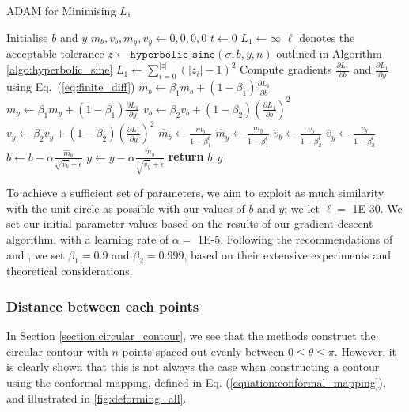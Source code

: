 \documentclass[a4paper]{report}
\begin{document}
\begin{algorithm}[H]
\caption{ADAM for Minimising $L_1$}
\label{algo:adam_l1}
\begin{algorithmic}[1]
\State Initialise $b$ and $y$
\State $m_b, v_b, m_y, v_y \gets 0, 0, 0, 0$
\State $t \gets 0$
\State $L_1 \gets \infty$
 \Comment $\ell$ denotes the acceptable tolerance
\State $z \gets \texttt{hyperbolic\_sine}(\sigma, b, y, n)$ \Comment outlined in Algorithm \ref{algo:hyperbolic_sine}
        \State $L_1 \gets \sum_{i=0}^{|z|} (|z_i| - 1)^2$
\State Compute gradients $\frac{\partial L_1}{\partial b}$ and $\frac{\partial L_1}{\partial y}$ \Comment using Eq.~(\ref{eq:finite_diff})
\State $m_b \gets \beta_1 m_b + (1 - \beta_1) \frac{\partial L_1}{\partial b}$
\State $m_y \gets \beta_1 m_y + (1 - \beta_1) \frac{\partial L_1}{\partial y}$
\State $v_b \gets \beta_2 v_b + (1 - \beta_2) (\frac{\partial L_1}{\partial b})^2$
\State $v_y \gets \beta_2 v_y + (1 - \beta_2) (\frac{\partial L_1}{\partial y})^2$
\State $\hat{m}_b \gets \frac{m_b}{1 - \beta_1^t}$
\State $\hat{m}_y \gets \frac{m_y}{1 - \beta_1^t}$
\State $\hat{v}_b \gets \frac{v_b}{1 - \beta_2^t}$
\State $\hat{v}_y \gets \frac{v_y}{1 - \beta_2^t}$
\State $b \gets b - \alpha \frac{\hat{m}_b}{\sqrt{\hat{v}_b} + \epsilon}$
\State $y \gets y - \alpha \frac{\hat{m}_y}{\sqrt{\hat{v}_y} + \epsilon}$
\EndWhile
\State \textbf{return} $b, y$
\EndProcedure
\end{algorithmic}
\end{algorithm}

To achieve a sufficient set of parameters, we aim to exploit as much similarity with the unit circle as possible with our values of $b$ and $y$; we let $\ell = $ 1E-30. We set our initial parameter values based on the results of our gradient descent algorithm, with a learning rate of $\alpha =$ 1E-5. Following the recommendations of \citet{kingma2014adam} and \citet{goodfellow2016deep}, we set $\beta_1 = 0.9$ and $\beta_2 = 0.999$, based on their extensive experiments and theoretical considerations.
 
\subsubsection{Distance between each points}\label{section:point_distance}
In Section \ref{section:circular_contour}, we see that the methods construct the circular contour with $n$ points spaced out evenly between $0 \leq \theta \leq \pi$. However, it is clearly shown that this is not always the case when constructing a contour using the conformal mapping, defined in Eq. (\ref{equation:conformal_mapping}), and illustrated in \autoref{fig:deforming_all}.
\end{document}
